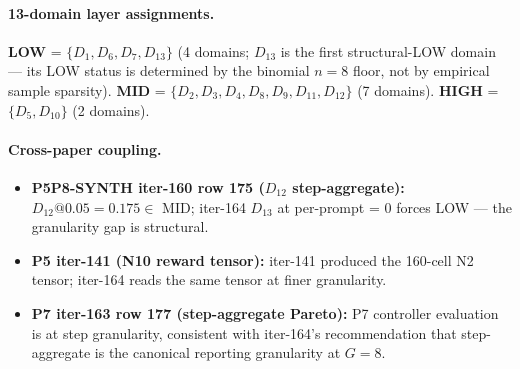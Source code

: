 \paragraph{13-domain layer assignments.}
\textbf{LOW} = $\{D_1, D_6, D_7, D_{13}\}$ (4 domains; $D_{13}$ is the
first structural-LOW domain — its LOW status is determined by the
binomial $n=8$ floor, not by empirical sample sparsity).
\textbf{MID} = $\{D_2, D_3, D_4, D_8, D_9, D_{11}, D_{12}\}$ (7 domains).
\textbf{HIGH} = $\{D_5, D_{10}\}$ (2 domains).

\paragraph{Cross-paper coupling.}
\begin{itemize}
\item \textbf{P5P8-SYNTH iter-160 row 175 ($D_{12}$ step-aggregate):}
$D_{12}@0.05 = 0.175 \in$ MID; iter-164 $D_{13}$ at per-prompt = 0
forces LOW — the granularity gap is structural.
\item \textbf{P5 iter-141 (N10 reward tensor):} iter-141 produced the
160-cell N2 tensor; iter-164 reads the same tensor at finer granularity.
\item \textbf{P7 iter-163 row 177 (step-aggregate Pareto):} P7 controller
evaluation is at step granularity, consistent with iter-164's
recommendation that step-aggregate is the canonical reporting granularity
at $G=8$.
\end{itemize}